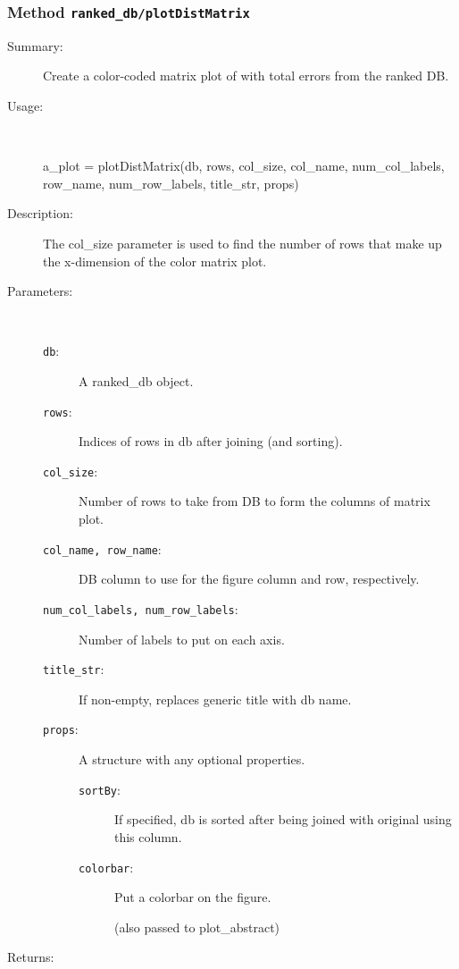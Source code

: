 \subsubsection[Method \texttt{plotDistMatrix}]{Method \texttt{ranked\_db/plotDistMatrix}}%
%
\label{ref_ranked_db__plotDistMatrix}%
\hypertarget{ref_ranked_db__plotDistMatrix}{}%
\begin{description}
\item[Summary:]Create a color-coded matrix plot of with total errors from the ranked DB.
%
\item[Usage:]~%
\begin{lyxcode}%
a\_plot = plotDistMatrix(db, rows, col\_size, col\_name, num\_col\_labels, 
			  row\_name, num\_row\_labels, title\_str, props)
%
\end{lyxcode}%
%
\item[Description:]%
The col\_size parameter is used to find the number of rows that make up the 
 x-dimension of the color matrix plot.
\item[Parameters:]~
\begin{description}%
\item[\texttt{db}:]
 A ranked\_db object.
\item[\texttt{rows}:]
 Indices of rows in db after joining (and sorting).
\item[\texttt{col\_size}:]
 Number of rows to take from DB to form the columns of matrix plot.
\item[\texttt{col\_name, row\_name}:]
 DB column to use for the figure column and row, respectively.
\item[\texttt{num\_col\_labels, num\_row\_labels}:]
 Number of labels to put on each axis.
\item[\texttt{title\_str}:]
 If non-empty, replaces generic title with db name. 
\item[\texttt{props}:]
 A structure with any optional properties.
\begin{description}%
\item[\texttt{sortBy}:]
 If specified, db is sorted after being joined with original using this column.
\item[\texttt{colorbar}:]
 Put a colorbar on the figure.

(also passed to plot\_abstract)\end{description}%
\end{description}%
%
\item[Returns:]~


\end{description}
